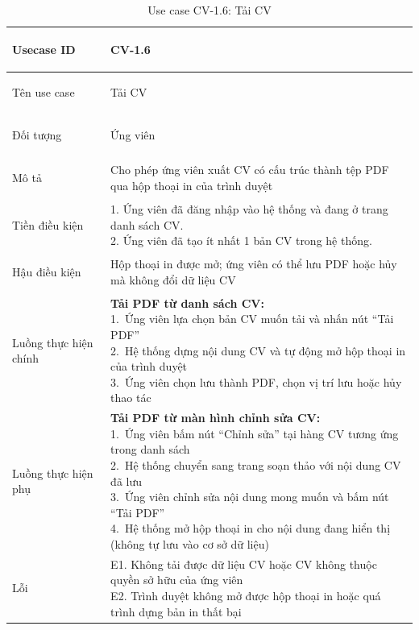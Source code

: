 \begin{table}[H]
    \centering
    \small
    \renewcommand{\arraystretch}{0.95}
    \begin{tabularx}{\textwidth}{|
        >{\bfseries\raggedright\arraybackslash}p{2.6cm}|Y|}
        \hline

        Usecase ID & CV-1.6 \\ \hline

        Tên use case & Tải CV \\ \hline

        Đối tượng & Ứng viên \\ \hline

        Mô tả & Cho phép ứng viên xuất CV có cấu trúc thành tệp PDF qua hộp thoại in của trình duyệt \\ \hline

        Tiền điều kiện &
        \parbox[t]{\hsize}{
            1. Ứng viên đã đăng nhập vào hệ thống và đang ở trang danh sách CV.\\
            2. Ứng viên đã tạo ít nhất 1 bản CV trong hệ thống.
        } \\
        \hline

        Hậu điều kiện & Hộp thoại in được mở; ứng viên có thể lưu PDF hoặc hủy mà không đổi dữ liệu CV \\ \hline

        Luồng thực hiện chính &
        \parbox[t]{\hsize}{
            \textbf{Tải PDF từ danh sách CV:}\\
            1.\ Ứng viên lựa chọn bản CV muốn tải và nhấn nút ``Tải PDF''\\
            2.\ Hệ thống dựng nội dung CV và tự động mở hộp thoại in của trình duyệt\\
            3.\ Ứng viên chọn lưu thành PDF, chọn vị trí lưu hoặc hủy thao tác
        }\\
        \hline

        Luồng thực hiện phụ & 
        \parbox[t]{\hsize}{
            \textbf{Tải PDF từ màn hình chỉnh sửa CV:}\\
            1.\ Ứng viên bấm nút ``Chỉnh sửa'' tại hàng CV tương ứng trong danh sách\\
            2.\ Hệ thống chuyển sang trang soạn thảo với nội dung CV đã lưu\\
            3.\ Ứng viên chỉnh sửa nội dung mong muốn và bấm nút ``Tải PDF''\\
            4.\ Hệ thống mở hộp thoại in cho nội dung đang hiển thị (không tự lưu vào cơ sở dữ liệu)
        }\\
        \hline

        Lỗi &
        \parbox[t]{\hsize}{
            E1. Không tải được dữ liệu CV hoặc CV không thuộc quyền sở hữu của ứng viên\\
            E2. Trình duyệt không mở được hộp thoại in hoặc quá trình dựng bản in thất bại
        }\\
        \hline

    \end{tabularx}
    \caption{Use case CV-1.6: Tải CV}
    \label{tab:usecase-cv16}
\end{table}

